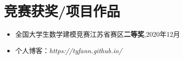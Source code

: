 \documentclass{resume}
\begin{document}
\section{竞赛获奖/项目作品}
\begin{itemize}[parsep=0.2ex]
  \item 全国大学生数学建模竞赛江苏省赛区\textbf{二等奖},2020年12月
  \item 个人博客：\textit{https://tyfann.github.io/}
\end{itemize}




%
%
\end{document}
